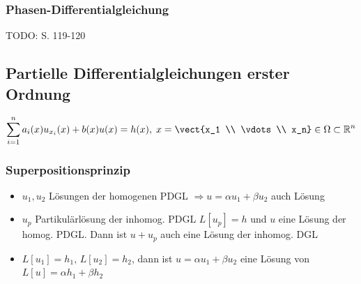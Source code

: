 \subsubsection{Phasen-Differentialgleichung}
TODO: S. 119-120

\subsection{Partielle Differentialgleichungen erster Ordnung}
\begin{equation*}
    \sum_{i=1}^{n} a_i(x)u_{x_i}(x) + b(x)u(x) = h(x), \; x=\vect{x_1 \\ \vdots \\ x_n}\in\Omega\subset\mathbb R^n
\end{equation*}

\begin{sectionbox}
    \subsubsection{Superpositionsprinzip}
    \begin{itemize}
        \item $u_1,u_2$ Lösungen der homogenen PDGL $\Rightarrow u=\alpha u_1 +\beta u_2$ auch Lösung
        \item $u_p$ Partikulärlösung der inhomog. PDGL $L[u_p]=h$ und $u$ eine Lösung der homog. PDGL. Dann ist $u+u_p$ auch eine Lösung der inhomog. DGL
        \item $L[u_1]=h_1, \, L[u_2]=h_2$, dann ist $u=\alpha u_1+\beta u_2$ eine Lösung von $L[u]=\alpha h_1 + \beta h_2$
    \end{itemize}
\end{sectionbox}

